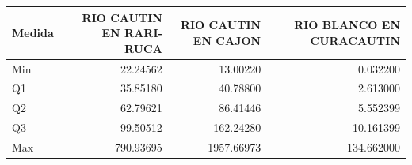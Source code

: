 
\begin{tabular}{l|r|r|r}
\hline
Medida & RIO CAUTIN EN RARI-RUCA & RIO CAUTIN EN CAJON & RIO BLANCO EN CURACAUTIN\\
\hline
Min & 22.24562 & 13.00220 & 0.032200\\
\hline
Q1 & 35.85180 & 40.78800 & 2.613000\\
\hline
Q2 & 62.79621 & 86.41446 & 5.552399\\
\hline
Q3 & 99.50512 & 162.24280 & 10.161399\\
\hline
Max & 790.93695 & 1957.66973 & 134.662000\\
\hline
\end{tabular}
